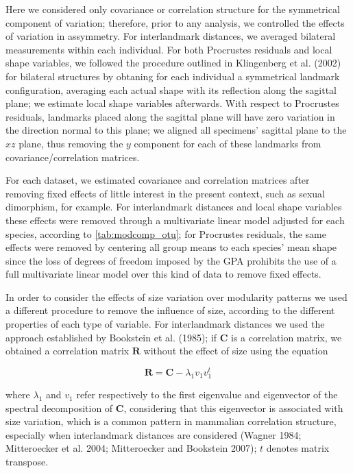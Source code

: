 \documentclass[12pt,]{article}
\begin{document}
Here we considered only covariance or correlation structure for the
symmetrical component of variation; therefore, prior to any analysis, we
controlled the effects of variation in assymmetry. For interlandmark
distances, we averaged bilateral measurements within each individual.
For both Procrustes residuals and local shape variables, we followed the
procedure outlined in Klingenberg et al. (2002) for bilateral structures
by obtaning for each individual a symmetrical landmark configuration,
averaging each actual shape with its reflection along the sagittal
plane; we estimate local shape variables afterwards. With respect to
Procrustes residuals, landmarks placed along the sagittal plane will
have zero variation in the direction normal to this plane; we aligned
all specimens' sagittal plane to the $xz$ plane, thus removing the $y$
component for each of these landmarks from covariance/correlation
matrices.

For each dataset, we estimated covariance and correlation matrices after
removing fixed effects of little interest in the present context, such
as sexual dimorphism, for example. For interlandmark distances and local
shape variables these effects were removed through a multivariate linear
model adjusted for each species, according to \autoref{tab:modcomp_otu};
for Procrustes residuals, the same effects were removed by centering all
group means to each species' mean shape since the loss of degrees of
freedom imposed by the GPA prohibits the use of a full multivariate
linear model over this kind of data to remove fixed effects.

In order to consider the effects of size variation over modularity
patterns we used a different procedure to remove the influence of size,
according to the different properties of each type of variable. For
interlandmark distances we used the approach established by Bookstein et
al. (1985); if $\mathbf{C}$ is a correlation matrix, we obtained a
correlation matrix $\mathbf{R}$ without the effect of size using the
equation

\begin{equation}
\mathbf{R} = \mathbf{C} - \lambda_1 v_1 v^{t}_1
\label{eq:iso}
\end{equation}

where $\lambda_1$ and $v_1$ refer respectively to the first eigenvalue
and eigenvector of the spectral decomposition of $\mathbf{C}$,
considering that this eigenvector is associated with size variation,
which is a common pattern in mammalian correlation structure, especially
when interlandmark distances are considered (Wagner 1984; Mitteroecker
et al. 2004; Mitteroecker and Bookstein 2007); $t$ denotes matrix
transpose.
\end{document}
